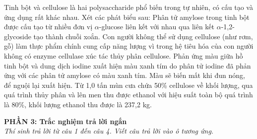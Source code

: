 \documentclass[11pt,a4paper]{article}
\begin{document}
\begin{ex}
Tinh bột và cellulose là hai polysaccharide phổ biến trong tự nhiên, có cấu tạo và ứng dụng rất khác nhau. Xét các phát biểu sau:
\choiceTF
{Phân tử amylose trong tinh bột được cấu tạo từ nhiều đơn vị $\alpha$-glucose liên kết với nhau qua liên kết $\alpha$-1,2-glycoside tạo thành chuỗi xoắn.}
{\True Con người không thể sử dụng cellulose (như rơm, gỗ) làm thực phẩm chính cung cấp năng lượng vì trong hệ tiêu hóa của con người không có enzyme cellulase xúc tác thủy phân cellulose.}
{Phản ứng màu giữa hồ tinh bột và dung dịch iodine xuất hiện màu xanh tím do phân tử iodine đã phản ứng với các phân tử amylose có màu xanh tím. Màu sẽ biến mất khi đun nóng, để nguội lại xuất hiện.}
{Từ 1,0 tấn mùn cưa chứa 50\% cellulose về khối lượng, qua quá trình thủy phân và lên men thu được ethanol với hiệu suất toàn bộ quá trình là 80\%, khối lượng ethanol thu được là 237,2 kg.}
\end{ex}


\vspace{5pt}
\noindent
\textbf{\color{mainGreen}PHẦN 3: Trắc nghiệm trả lời ngắn}\\
\textit{Thí sinh trả lời từ câu 1 đến câu 4. Viết câu trả lời vào ô tương ứng.}
\end{document}

